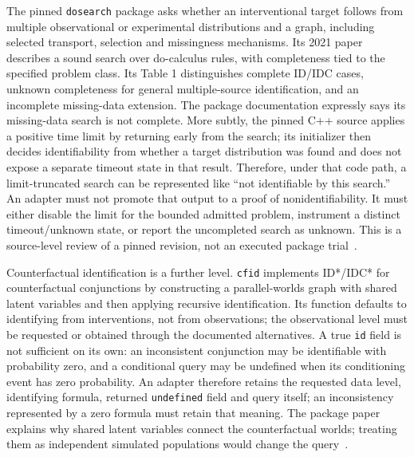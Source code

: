 The pinned \texttt{dosearch} package asks whether an interventional target follows from multiple observational or experimental distributions and a graph, including selected transport, selection and missingness mechanisms. Its 2021 paper describes a sound search over do-calculus rules, with completeness tied to the specified problem class. Its Table 1 distinguishes complete ID/IDC cases, unknown completeness for general multiple-source identification, and an incomplete missing-data extension. The package documentation expressly says its missing-data search is not complete. More subtly, the pinned C++ source applies a positive time limit by returning early from the search; its initializer then decides identifiability from whether a target distribution was found and does not expose a separate timeout state in that result. Therefore, under that code path, a limit-truncated search can be represented like “not identifiable by this search.” An adapter must not promote that output to a proof of nonidentifiability. It must either disable the limit for the bounded admitted problem, instrument a distinct timeout/unknown state, or report the uncompleted search as unknown. This is a source-level review of a pinned revision, not an executed package trial~\citep{exec18_rid_dosearch,exec18_rid_dosearch_paper}.

Counterfactual identification is a further level. \texttt{cfid} implements ID*/IDC* for counterfactual conjunctions by constructing a parallel-worlds graph with shared latent variables and then applying recursive identification. Its function defaults to identifying from interventions, not from observations; the observational level must be requested or obtained through the documented alternatives. A true \texttt{id} field is not sufficient on its own: an inconsistent conjunction may be identifiable with probability zero, and a conditional query may be undefined when its conditioning event has zero probability. An adapter therefore retains the requested data level, identifying formula, returned \texttt{undefined} field and query itself; an inconsistency represented by a zero formula must retain that meaning. The package paper explains why shared latent variables connect the counterfactual worlds; treating them as independent simulated populations would change the query~\citep{exec18_rid_cfid,exec18_rid_cfid_paper}.

